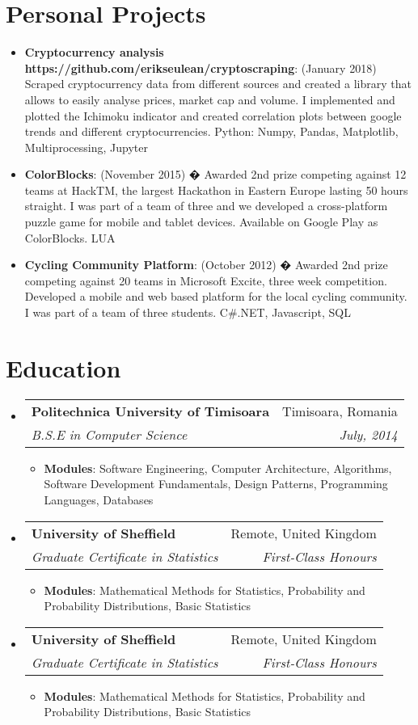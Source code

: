 \documentclass[letterpaper,11pt]{article}
\makeatletter
\newcommand{\resumeItem}[2]{
  \item\small{
    \textbf{#1}{: #2 \vspace{-1pt}}
  }
}
\newcommand{\resumeSubheading}[4]{
  \vspace{-1pt}\item
    \begin{tabular*}{0.97\textwidth}{l@{\extracolsep{\fill}}r}
      \textbf{#1} & #2 \\
      \textit{\small#3} & \textit{\small #4} \\
    \end{tabular*}\vspace{-5pt}
}
\newcommand{\resumeSubItem}[2]{\resumeItem{#1}{#2}\vspace{-5pt}}
\newcommand{\resumeSubHeadingListStart}{\begin{itemize}[leftmargin=*]}
\newcommand{\resumeSubHeadingListEnd}{\end{itemize}}
\newcommand{\resumeItemListStart}{\begin{itemize}}
\newcommand{\resumeItemListEnd}{\end{itemize}\vspace{-4.6pt}}
\makeatother
\begin{document}
\section{Personal Projects}
  \resumeSubHeadingListStart
    \resumeSubItem {Cryptocurrency analysis https://github.com/erikseulean/cryptoscraping}
    {(January 2018) Scraped cryptocurrency data from different sources and created a library that allows to easily analyse prices, market cap and volume. I implemented and plotted the Ichimoku indicator and created correlation plots between google trends and different cryptocurrencies. Python: Numpy, Pandas, Matplotlib, Multiprocessing, Jupyter}
    \resumeSubItem{ColorBlocks}
      {(November 2015) � Awarded 2nd prize competing against 12 teams at HackTM, the largest Hackathon in Eastern Europe lasting 50 hours straight. I was part of a team of three and we developed a cross-platform puzzle game for mobile and tablet devices. Available on Google Play as ColorBlocks. LUA}
    \resumeSubItem{Cycling Community Platform}
    	{(October 2012) � Awarded 2nd prize competing against 20 teams in Microsoft Excite, three week competition. Developed a mobile and web based platform for the local cycling community. I was part of a team of three students. C\#.NET, Javascript, SQL}
  \resumeSubHeadingListEnd


\section{Education}
  \resumeSubHeadingListStart
    \resumeSubheading
      {Politechnica University of Timisoara}{Timisoara, Romania}
      {B.S.E in Computer Science}{July, 2014}
    \resumeItemListStart
    	\resumeItem{Modules}
        {Software Engineering, Computer Architecture, Algorithms, Software Development Fundamentals, Design Patterns, Programming Languages, Databases}
    \resumeItemListEnd
    \resumeSubheading
      {University of Sheffield}{Remote, United Kingdom}
      {Graduate Certificate in Statistics}{First-Class Honours}
    \resumeItemListStart
    	\resumeItem{Modules}
        {Mathematical Methods for Statistics, Probability and Probability Distributions, Basic Statistics}
    \resumeItemListEnd
    \resumeSubheading
      {University of Sheffield}{Remote, United Kingdom}
      {Graduate Certificate in Statistics}{First-Class Honours}
    \resumeItemListStart
    	\resumeItem{Modules}
        {Mathematical Methods for Statistics, Probability and Probability Distributions, Basic Statistics}
    \resumeItemListEnd        
  \resumeSubHeadingListEnd
\end{document}
